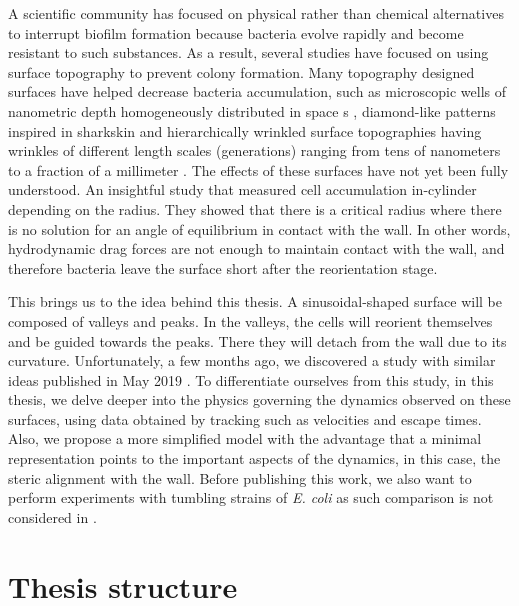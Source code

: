 A scientific community has focused on physical rather than chemical alternatives to interrupt biofilm formation because bacteria evolve rapidly and become resistant to such substances. As a result, several studies have focused on using surface topography to prevent colony formation. Many topography designed surfaces have helped decrease bacteria accumulation, such as microscopic wells of nanometric depth homogeneously distributed in space s \cite{Perera-Costa2014StudyingPatterns}, diamond-like patterns inspired in sharkskin \cite{Reddy2011MicropatternedColi} and hierarchically wrinkled surface topographies having wrinkles of different length scales (generations) ranging from tens of nanometers to a fraction of a millimeter \cite{Efimenko2009DevelopmentAntifouling}. The effects of these surfaces have not yet been fully understood. An insightful study that measured cell accumulation in-cylinder depending on the radius. They showed that there is a critical radius where there is no solution for an angle of equilibrium in contact with the wall. In other words, hydrodynamic drag forces are not enough to maintain contact with the wall, and therefore bacteria leave the surface \cite{Sipos2015HydrodynamicWalls} short after the reorientation stage. 

This brings us to the idea behind this thesis. A sinusoidal-shaped surface will be composed of valleys and peaks. In the valleys, the cells will reorient themselves and be guided towards the peaks. There they will detach from the wall due to its curvature. Unfortunately, a few months ago, we discovered a study with similar ideas published in May 2019 \cite{Mok2019GeometricAccumulation}. To differentiate ourselves from this study, in this thesis, we delve deeper into the physics governing the dynamics observed on these surfaces, using data obtained by tracking such as velocities and escape times. Also, we propose a more simplified model with the advantage that a minimal representation points to the important aspects of the dynamics, in this case, the steric alignment with the wall. Before publishing this work, we also want to perform experiments with tumbling strains of \textit{E. coli} as such comparison is not considered in \cite{Mok2019GeometricAccumulation}.

\section{Thesis structure}

